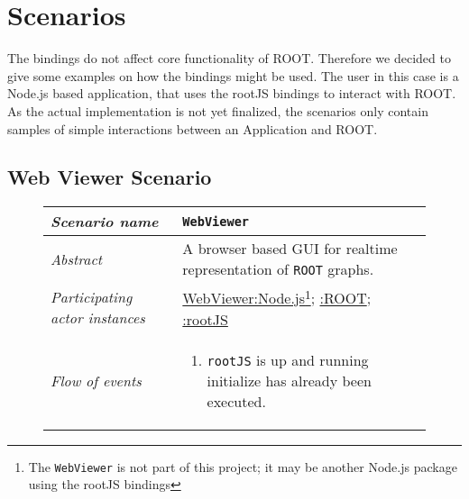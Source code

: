 \section{Scenarios}

The bindings do not affect core functionality of ROOT. Therefore 
we decided to give some examples on how the bindings might be used. The 
user in this case is a Node.js based application, that uses the rootJS bindings 
to interact with ROOT. As the actual implementation is not yet 
finalized, the scenarios only contain samples of simple interactions 
between an Application and ROOT.

\subsection{Web Viewer Scenario}
\begin{figure}[htb]
	\centering
	\begin{longtable}{p{3cm} @{\hskip 1cm} p{12cm}}
		\hline
		
		\textit{Scenario name} &  \texttt{WebViewer}\\
		\hline
	
		\textit{Abstract} & A browser based GUI for realtime representation of \texttt{ROOT} graphs.\\
		\hline
	
		\textit{Participating actor instances} & \underline{WebViewer:Node.js}\footnote{The \texttt{WebViewer} is not part of this project; it may be another Node.js package using the rootJS bindings}; \underline{:ROOT}; \underline{:rootJS}\\
		\hline
	
		\textit{Flow of events} & 
		\begin{enumerate}
			\item \texttt{rootJS} is up and running initialize has already been executed.
			

\end{enumerate}
\end{longtable}
\end{figure}

